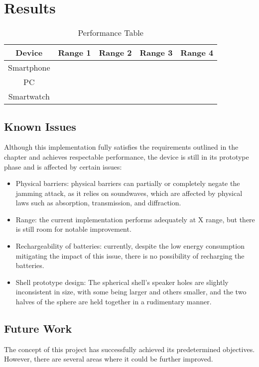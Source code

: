 \chapter{Results}
\begin{table}[H]
    \center
    \begin{tabular}{|c|l|l|l|l|}
    \hline
    Device     & Range 1 & Range 2 & Range 3 & Range 4 \\ \hline
    Smartphone &         &         &         &         \\ \hline
    PC         &         &         &         &         \\ \hline
    Smartwatch &         &         &         &         \\ \hline
    \end{tabular}
    \caption{Performance Table}
    \end{table}

\section{Known Issues}
Although this implementation fully satisfies the requirements outlined in the  chapter and achieves respectable performance, the device is still in its prototype phase and is affected by certain issues:
\begin{itemize}
    \item Physical barriers: physical barriers can partially or completely negate the jamming attack, as it relies on soundwaves, which are affected by physical laws such as absorption, transmission, and diffraction.
    \item Range: the current implementation performs adequately at X range, but there is still room for notable improvement.
    \item Rechargeability of batteries: currently, despite the low energy consumption mitigating the impact of this issue, there is no possibility of recharging the batteries.
    \item Shell prototype design: The spherical shell's speaker holes are slightly inconsistent in size, with some being larger and others smaller, and the two halves of the sphere are held together in a rudimentary manner.
\end{itemize}
\section{Future Work}
The concept of this project has successfully achieved its predetermined objectives. 
However, there are several areas where it could be further improved. 

